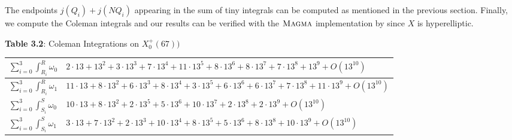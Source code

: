 \begin{itemize}
The endpoints $j(Q_i) + j(NQ_i)$ appearing in the sum of tiny integrals can be computed as mentioned in the previous section. Finally, we compute the Coleman integrals and our results can be verified with the $\textsc{Magma}{}$ implementation by \cite{balatuit} since $X$ is hyperelliptic. 

    \begin{center}
    \textbf{Table 3.2}: Coleman Integrations on $X_0^+(67))$
    \end{center}
\begin{table}[h]

    \centering
    \begin{tabular}{|l|l|}
    \hline
    \rule{0pt}{4ex}    

        $\sum_{i=0}^{3}\int^R_{R_i} \omega_0 $    & $2\cdot 13 + 13^2 + 3\cdot 13^3 + 7\cdot 13^4 + 11\cdot 13^5 + 8\cdot 13^6 + 8\cdot 13^7 + 7\cdot 13^8 + 13^9 +  O(13^{10})$ 
            \rule{0pt}{4ex} \\
\hline
            \rule{0pt}{4ex}
        $\sum_{i=0}^{3}\int^R_{R_i} \omega_1 $  & $11\cdot 13 + 8\cdot 13^2 + 6\cdot 13^3 + 8\cdot 13^4 + 3\cdot 13^5+ 6\cdot 13^6 + 6\cdot 13^7 + 7\cdot 13^8 + 11\cdot 13^9 + O(13^{10}) $
            \rule{0pt}{4ex}
\\\hline
            \rule{0pt}{4ex}
       $\sum_{i=0}^{3}\int^S_{S_i} \omega_0 $ & $10\cdot  13 + 8\cdot 13^2 + 2\cdot 13^5 + 5\cdot 13^6 + 10\cdot 13^7 + 2\cdot 13^8 + 2\cdot 13^9+ O(13^{10}) $   \rule{0pt}{4ex}    
\\\hline
           \rule{0pt}{4ex}    
        $\sum_{i=0}^{3}\int^S_{S_i} \omega_1 $ &  $3\cdot 13 + 7\cdot 13^2 + 2\cdot 13^3 + 10\cdot 13^4 + 8\cdot 13^5+ 5\cdot 13^6 + 8\cdot 13^8 + 10\cdot 13^9+ O(13^{10}) $   \rule{0pt}{4ex}    
\\\hline
        
    \end{tabular}

    \label{table:X_0^+(67)_results}
\end{table}

\end{itemize}
